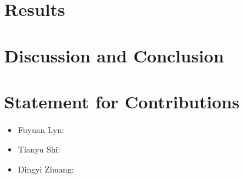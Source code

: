 \documentclass[11pt]{scrartcl}
\begin{document}
\section{Results}
\section{Discussion and Conclusion}

\section{Statement for Contributions}
\begin{itemize}
	\item Fuyuan Lyu: 
	\item Tianyu Shi: 
	\item Dingyi Zhuang: 
\end{itemize}
\newpage



\end{document}
